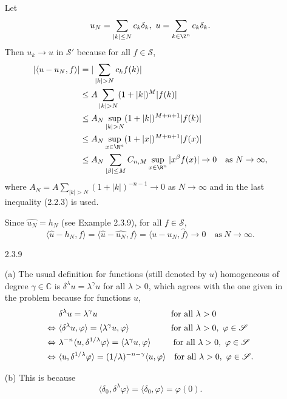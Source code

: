 \begin{itemize}
Let
$$u_N=\sum_{|k|\leq N}c_k\delta_k,\ u=\sum_{k\in\Z^n}c_k\delta_k.$$
Then $u_k \rightarrow u$ in $\mathscr{S}'$ because for all $f\in \mathscr{S}$,
\begin{align*}
    |\langle u-u_N,f\rangle|
    &=|\sum_{|k|>N}c_kf(k)|\\
    &\leq A\sum_{|k|>N}(1+|k|)^M|f(k)|\\
    &\leq A_N\sup_{|k|>N}(1+|k|)^{M+n+1}|f(k)|\\
    &\leq A_N\sup_{x\in\R^n}(1+|x|)^{M+n+1}|f(x)|\\
    &\leq A_N\sum_{|\beta|\leq M}C_{n,M}\sup_{x\in\R^n}|x^\beta f(x)|\rightarrow0\quad\text{as}\ N\rightarrow\infty,
\end{align*}
where $A_N=A\sum\limits_{|k|>N}(1+|k|)^{-n-1}\rightarrow0$ as $N\rightarrow\infty$ 
and in the last inequality (2.2.3) is used.

Since $\widehat{u_N}=h_N$ (see Example 2.3.9), for all $f\in \mathscr{S}$,
$$\langle \widehat{u}-h_N,f\rangle
=\langle \widehat{u}-\widehat{u_N},f\rangle
=\langle u-u_N,\hat{f}\rangle\rightarrow0\quad\text{as}\ N\rightarrow\infty.$$

\item[2.3.9]

(a) The usual definition for functions (still denoted by $u$) 
homogeneous of degree $\gamma\in\mathbb{C}$ is 
$\delta^\lambda u=\lambda^\gamma u$ for all $\lambda>0$, 
which agrees with the one given in the problem because for functions $u$,
\begin{align*}
    &\delta^\lambda u=\lambda^\gamma u
    \hspace{8.7em}\text{for all }\lambda>0\\
    \Leftrightarrow\ & \langle\delta^\lambda u,\varphi\rangle
    =\langle \lambda^\gamma u,\varphi\rangle
    \hspace{4.95em}\text{for all }\lambda>0,\ \varphi\in\mathscr{S}\\
    \Leftrightarrow\ & \lambda^{-n}\langle u,\delta^{1/\lambda}\varphi\rangle
    =\langle \lambda^\gamma u,\varphi\rangle
    \hspace{2.65em}\text{for all }\lambda>0,\ \varphi\in\mathscr{S}\\
    \Leftrightarrow\ & \langle u,\delta^{1/\lambda}\varphi\rangle
    =(1/\lambda)^{-n-\gamma}\langle u,\varphi\rangle
    \hspace{1em}\text{for all }\lambda>0,\ \varphi\in\mathscr{S}.
\end{align*}

(b) This is because
$$\langle \delta_0,\delta^\lambda\varphi\rangle
=\langle \delta_0,\varphi\rangle=\varphi(0).$$


\end{itemize}
